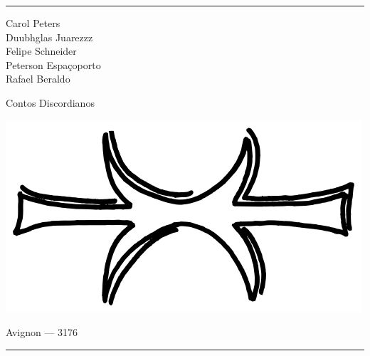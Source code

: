 \thispagestyle{empty}

\hrule

\begin{center}
{\scriptsize
Carol Peters\\
Duubhglas Juarezzz\\
Felipe Schneider\\
Peterson Espaçoporto\\
Rafael Beraldo\\
}
\vspace{.5cm}

{\Large Contos Discordianos}

\vspace{2cm}

\includegraphics[scale=.35]{eris_hand}

\vfill

Avignon --- 3176
\vspace{.5em}
\hrule

\end{center}
\newpage

